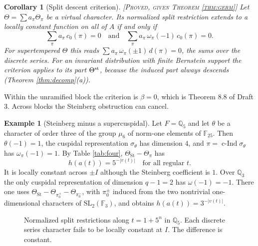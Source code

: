 \documentclass[12pt,letterpaper]{amsart}
\numberwithin{equation}{section}
\newtheorem{corollary}[theorem]{Corollary}
\theoremstyle{definition}
\newtheorem{example}[theorem]{Example}
\theoremstyle{remark}
\newcommand{\St}{\mathrm{St}}
\newcommand{\status}[1]{\textup{[\textsc{#1}]}}
\begin{document}
\begin{corollary}[Split descent criterion]\label{cor:descent}\status{Proved, given Theorem \ref{thm:germ}}
Let $\Theta=\sum a_\pi\Theta_\pi$ be a virtual character. Its normalized split restriction extends to a locally constant function on all of $A$ if and only if
\[
\sum_\pi a_\pi\,c_0(\pi)=0\quad\text{and}\quad\sum_\pi a_\pi\,\omega_\pi(-1)\,c_0(\pi)=0 .
\]
For supertempered $\Theta$ this reads $\sum a_\pi\,\omega_\pi(\pm1)\,d(\pi)=0$, the sums over the discrete series. For an invariant distribution with finite Bernstein support the criterion applies to its part $\Theta^{\rm st}$, because the induced part always descends (Theorem \ref{thm:decomp}(a)).
\end{corollary}
Within the unramified block the criterion is $\beta=0$, which is Theorem 8.8 of Draft 3. Across blocks the Steinberg obstruction can cancel.
\begin{example}[Steinberg minus a supercuspidal]\label{ex:cancel}
Let $F=\mathbb Q_5$ and let $\theta$ be a character of order three of the group $\mu_6$ of norm-one elements of $\mathbb F_{25}$. Then $\theta(-1)=1$, the cuspidal representation $\sigma_\theta$ has dimension $4$, and $\pi=\operatorname{c-Ind}\sigma_\theta$ has $\omega_\pi(-1)=1$. By Table \ref{tab:four}, $\Theta_{\St}-\Theta_\pi$ has
\[
h(a(t))=5^{-|v(t)|}\quad\text{for all regular }t .
\]
It is locally constant across $\pm I$ although the Steinberg coefficient is $1$. Over $\mathbb Q_3$ the only cuspidal representation of dimension $q-1=2$ has $\omega(-1)=-1$. There one uses $\Theta_{\St}-\Theta_{\pi_0^+}-\Theta_{\pi_0^-}$, with $\pi_0^\pm$ induced from the two nontrivial one-dimensional characters of $\mathrm{SL}_2(\mathbb F_3)$, and obtains $h(a(t))=3^{-|v(t)|}$.
\end{example}
\begin{figure}[htbp]\centering
{}
\caption{Normalized split restrictions along $t=1+5^n$ in $\mathbb Q_5$. Each discrete series character fails to be locally constant at $I$. The difference is constant.}\label{fig:cancel}
\end{figure}
\end{document}
